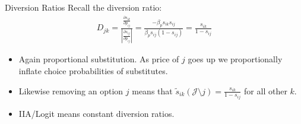 \begin{frame}{Diversion Ratios}
Recall the diversion ratio:
\begin{align*}
D_{jk} =\frac{\frac{\partial s_{ik}}{\partial p_{ij}}}{\left |\frac{\partial s_{ij}}{\partial p_{ij}} \right|} = \frac{- \beta_p s_{ik} s_{ij}}{\beta_p s_{ij} (1-s_{ij})} = \frac{s_{ik}}{1-s_{ij}}
\end{align*}
\begin{itemize}
\item Again proportional substitution. As price of $j$ goes up we proportionally inflate choice probabilities of substitutes.
\item Likewise removing an option $j$ means that $\tilde{s}_{ik}(\mathcal{J} \setminus j) = \frac{s_{ik}}{1-s_{ij}}$ for all other $k$.
\item IIA/Logit means \alert{constant diversion ratios}.
\end{itemize}
\end{frame}
%
%
%
%
%
%
%
